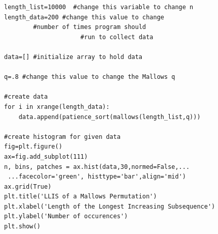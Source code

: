 \documentclass[12pt]{report}
\theoremstyle{definition}
\begin{document}
\begin{lstlisting}
length_list=10000  #change this variable to change n
length_data=200 #change this value to change 
		#number of times program should
                     #run to collect data
    
data=[] #initialize array to hold data

q=.8 #change this value to change the Mallows q

#create data
for i in xrange(length_data):
    data.append(patience_sort(mallows(length_list,q)))

#create histogram for given data
fig=plt.figure() 
ax=fig.add_subplot(111)
n, bins, patches = ax.hist(data,30,normed=False,...
 ...facecolor='green', histtype='bar',align='mid')
ax.grid(True)
plt.title('LLIS of a Mallows Permutation')
plt.xlabel('Length of the Longest Increasing Subsequence')
plt.ylabel('Number of occurences')
plt.show()

\end{lstlisting}


\end{document}
